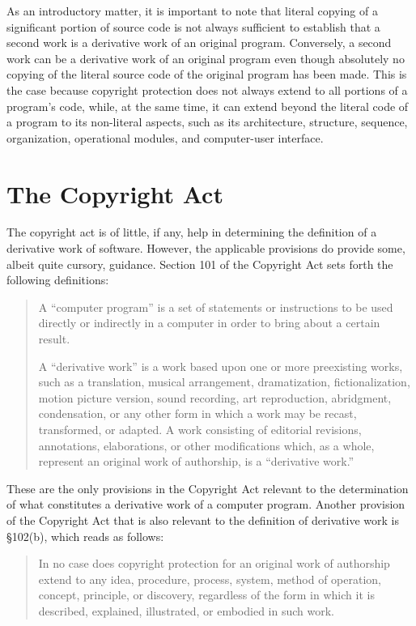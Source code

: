 As an introductory matter, it is important to note that literal copying of
a significant portion of source code is not always sufficient to establish
that a second work is a derivative work of an original
program. Conversely, a second work can be a derivative work of an original
program even though absolutely no copying of the literal source code of
the original program has been made. This is the case because copyright
protection does not always extend to all portions of a program's code,
while, at the same time, it can extend beyond the literal code of a
program to its non-literal aspects, such as its architecture, structure,
sequence, organization, operational modules, and computer-user interface.

\section{The Copyright Act}

The copyright act is of little, if any, help in determining the definition
of a derivative work of software. However, the applicable provisions do
provide some, albeit quite cursory, guidance. Section 101 of the Copyright
Act sets forth the following definitions:

\begin{quotation}
A ``computer program'' is a set of statements or instructions to be used
directly or indirectly in a computer in order to bring about a certain
result.

A ``derivative work'' is a work based upon one or more preexisting works,
such as a translation, musical arrangement, dramatization,
fictionalization, motion picture version, sound recording, art
reproduction, abridgment, condensation, or any other form in which a work
may be recast, transformed, or adapted. A work consisting of editorial
revisions, annotations, elaborations, or other modifications which, as a
whole, represent an original work of authorship, is a ``derivative work.''
\end{quotation}

These are the only provisions in the Copyright Act relevant to the
determination of what constitutes a derivative work of a computer
program. Another provision of the Copyright Act that is also relevant to
the definition of derivative work is \S 102(b), which reads as follows:

\begin{quotation}
In no case does copyright protection for an original work of authorship
extend to any idea, procedure, process, system, method of operation,
concept, principle, or discovery, regardless of the form in which it is
described, explained, illustrated, or embodied in such work.
\end{quotation}

